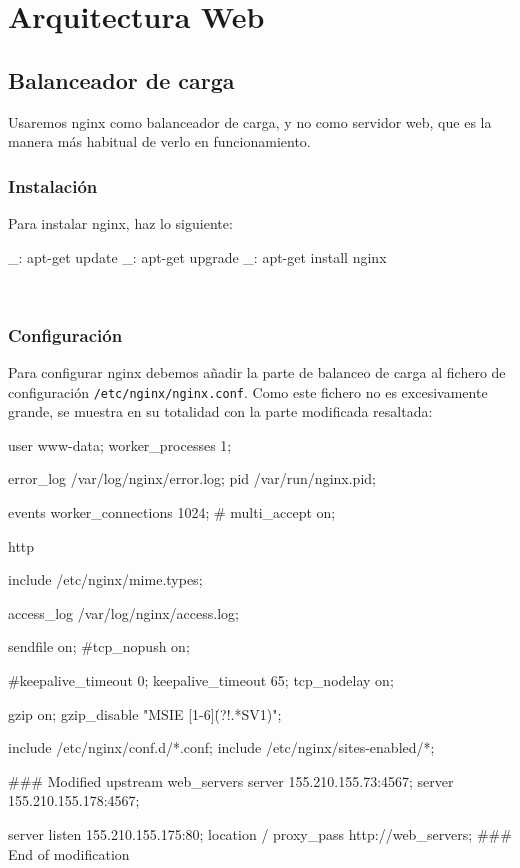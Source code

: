 \chapter{Arquitectura Web}
\label{web:web}


\section{Balanceador de carga}


Usaremos nginx como balanceador de carga, y no como servidor web, que es la manera más habitual de verlo en funcionamiento.


\subsection{Instalación}

Para instalar nginx, haz lo siguiente:

\begin{bashcode}
_: apt-get update
_: apt-get upgrade
_: apt-get install nginx
\end{bashcode}
\\


\subsection{Configuración}

Para configurar nginx debemos añadir la parte de balanceo de carga al fichero de configuración \texttt{/etc/nginx/nginx.conf}. Como este fichero no es excesivamente grande, se muestra en su totalidad con la parte modificada resaltada:

\begin{bashcode}
user www-data;
worker_processes  1;

error_log  /var/log/nginx/error.log;
pid        /var/run/nginx.pid;

events {
    worker_connections  1024;
    # multi_accept on;
}

http {
    include       /etc/nginx/mime.types;

    access_log	/var/log/nginx/access.log;

    sendfile        on;
    #tcp_nopush     on;

    #keepalive_timeout  0;
    keepalive_timeout  65;
    tcp_nodelay        on;

    gzip  on;
    gzip_disable "MSIE [1-6]\.(?!.*SV1)";

    include /etc/nginx/conf.d/*.conf;
    include /etc/nginx/sites-enabled/*;


    ### Modified
    upstream web_servers {
      server 155.210.155.73:4567;
      server 155.210.155.178:4567;
    }

    server {
      listen 155.210.155.175:80;
      location / {
        proxy_pass http://web_servers;
      }
    }
    ### End of modification


}
\end{bashcode}
\\


